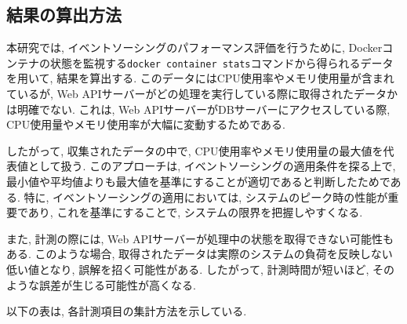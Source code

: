 \documentclass[../../../main]{subfiles}
\begin{document}
    \subsection{結果の算出方法}\label{subsec:method-calculation}

    本研究では, イベントソーシングのパフォーマンス評価を行うために, Dockerコンテナの状態を監視する\texttt{docker container stats}コマンドから得られるデータを用いて, 結果を算出する. このデータにはCPU使用率やメモリ使用量が含まれているが, Web APIサーバーがどの処理を実行している際に取得されたデータかは明確でない. これは, Web APIサーバーがDBサーバーにアクセスしている際, CPU使用量やメモリ使用率が大幅に変動するためである.

    したがって, 収集されたデータの中で, CPU使用率やメモリ使用量の最大値を代表値として扱う. このアプローチは, イベントソーシングの適用条件を探る上で, 最小値や平均値よりも最大値を基準にすることが適切であると判断したためである. 特に, イベントソーシングの適用においては, システムのピーク時の性能が重要であり, これを基準にすることで, システムの限界を把握しやすくなる.

    また, 計測の際には, Web APIサーバーが処理中の状態を取得できない可能性もある. このような場合, 取得されたデータは実際のシステムの負荷を反映しない低い値となり, 誤解を招く可能性がある. したがって, 計測時間が短いほど, そのような誤差が生じる可能性が高くなる.

    以下の表は, 各計測項目の集計方法を示している.

    

    \clearpage
\end{document}
